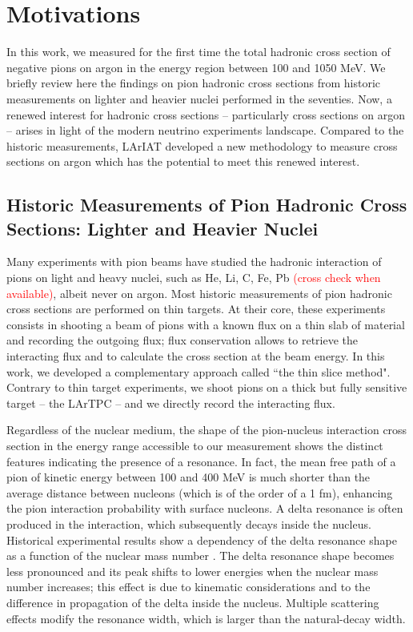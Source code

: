 \documentclass[aps,prl,twocolumn,showpacs,superscriptaddress,groupedaddress]{revtex4}  %
\begin{document}
\newpage
\section{\label{sec:Motivations}Motivations}
In this work, we measured  for the first time the total hadronic cross section of negative pions on argon in the energy region between 100 and 1050 MeV. We briefly review here the findings on pion hadronic cross sections from historic measurements on lighter and heavier nuclei performed in the seventies.  Now, a renewed interest for hadronic cross sections -- particularly cross sections on argon -- arises in light of the modern neutrino experiments landscape. Compared to the historic measurements, LArIAT developed a new  methodology to measure cross sections on argon which has the potential to meet this renewed interest. 

\subsection{Historic Measurements of Pion Hadronic Cross Sections: Lighter and Heavier Nuclei}
Many experiments with pion beams have studied the hadronic interaction of pions on light and heavy nuclei, such as  He, Li, C, Fe, Pb \cite{Wilkin:1973xd, Clough1974,PhysRevC.14.635} \textcolor{red}{(cross check when available)}, albeit never on argon.  Most historic measurements of pion hadronic cross sections are performed on thin targets. At their core, these experiments consists in shooting a beam of pions with a known flux on a thin slab of material and recording the outgoing flux; flux conservation allows to retrieve the interacting flux and to calculate the cross section at the beam energy.
In this work, we developed a complementary approach called ``the thin slice method". Contrary to thin target experiments, we shoot pions on a thick but fully sensitive target  -- the LArTPC -- and we directly record the interacting flux. 

Regardless of the nuclear medium, the shape of the pion-nucleus interaction cross section in the energy range accessible to our measurement shows the distinct features indicating the presence of a resonance. In fact, the mean free path of a pion of kinetic energy between 100 and 400 MeV is much shorter than the average distance between nucleons (which is of the order of a
 1 fm),   enhancing the pion interaction probability with surface nucleons. A delta resonance is often produced in the interaction, which subsequently decays inside the nucleus.
Historical experimental results show a dependency of the delta resonance shape as a function of the nuclear mass number \cite{PhysRevC.14.635}. The delta resonance shape becomes less pronounced  
and its peak shifts to lower energies when the nuclear mass number increases; this effect is due to kinematic considerations and to the difference in propagation of the delta inside the nucleus. Multiple scattering effects modify the resonance width, which is larger than the natural-decay width.
\end{document}
